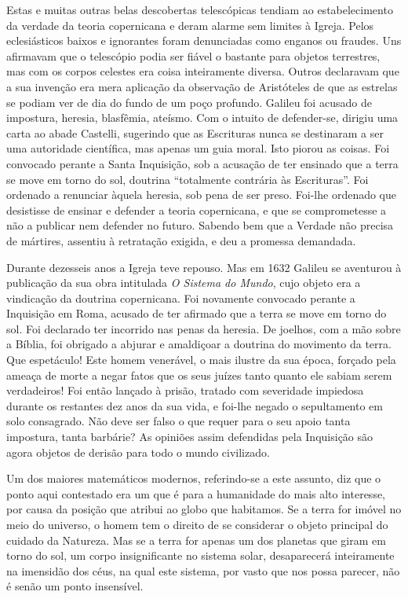 \documentclass[11pt,a5paper,twoside,openany]{book}
\begin{document}
Estas e muitas outras belas descobertas telescópicas tendiam ao estabelecimento da verdade da teoria copernicana e deram alarme sem limites à Igreja. Pelos eclesiásticos baixos e ignorantes foram denunciadas como enganos ou fraudes. Uns afirmavam que o telescópio podia ser fiável o bastante para objetos terrestres, mas com os corpos celestes era coisa inteiramente diversa. Outros declaravam que a sua invenção era mera aplicação da observação de Aristóteles de que as estrelas se podiam ver de dia do fundo de um poço profundo. Galileu foi acusado de impostura, heresia, blasfêmia, ateísmo. Com o intuito de defender-se, dirigiu uma carta ao abade Castelli, sugerindo que as Escrituras nunca se destinaram a ser uma autoridade científica, mas apenas um guia moral. Isto piorou as coisas. Foi convocado perante a Santa Inquisição, sob a acusação de ter ensinado que a terra se move em torno do sol, doutrina “totalmente contrária às Escrituras”. Foi ordenado a renunciar àquela heresia, sob pena de ser preso. Foi-lhe ordenado que desistisse de ensinar e defender a teoria copernicana, e que se comprometesse a não a publicar nem defender no futuro. Sabendo bem que a Verdade não precisa de mártires, assentiu à retratação exigida, e deu a promessa demandada.

Durante dezesseis anos a Igreja teve repouso. Mas em 1632 Galileu se aventurou à publicação da sua obra intitulada \textit{O Sistema do Mundo}, cujo objeto era a vindicação da doutrina copernicana. Foi novamente convocado perante a Inquisição em Roma, acusado de ter afirmado que a terra se move em torno do sol. Foi declarado ter incorrido nas penas da heresia. De joelhos, com a mão sobre a Bíblia, foi obrigado a abjurar e amaldiçoar a doutrina do movimento da terra. Que espetáculo! Este homem venerável, o mais ilustre da sua época, forçado pela ameaça de morte a negar fatos que os seus juízes tanto quanto ele sabiam serem verdadeiros! Foi então lançado à prisão, tratado com severidade impiedosa durante os restantes dez anos da sua vida, e foi-lhe negado o sepultamento em solo consagrado. Não deve ser falso o que requer para o seu apoio tanta impostura, tanta barbárie? As opiniões assim defendidas pela Inquisição são agora objetos de derisão para todo o mundo civilizado.

Um dos maiores matemáticos modernos, referindo-se a este assunto, diz que o ponto aqui contestado era um que é para a humanidade do mais alto interesse, por causa da posição que atribui ao globo que habitamos. Se a terra for imóvel no meio do universo, o homem tem o direito de se considerar o objeto principal do cuidado da Natureza. Mas se a terra for apenas um dos planetas que giram em torno do sol, um corpo insignificante no sistema solar, desaparecerá inteiramente na imensidão dos céus, na qual este sistema, por vasto que nos possa parecer, não é senão um ponto insensível.
\end{document}
